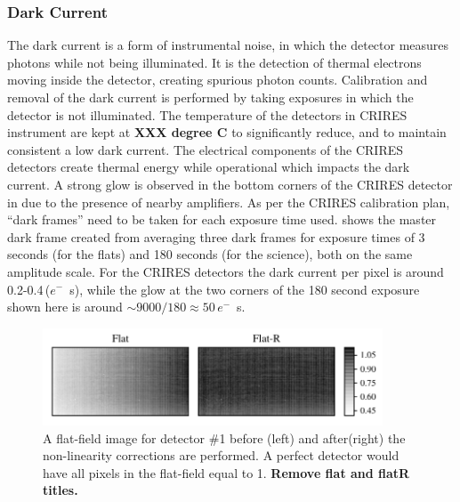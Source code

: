\subsubsection{Dark Current}
The dark current is a form of instrumental noise, in which the detector measures photons while not being illuminated. It is the detection of thermal electrons moving inside the detector, creating spurious photon counts. Calibration and removal of the dark current is performed by taking exposures in which the detector is not illuminated. 
 The temperature of the detectors in CRIRES instrument are kept at \textbf{XXX degree C} to significantly reduce, and to maintain consistent a low dark current. The electrical components of the CRIRES detectors create thermal energy while operational which impacts the dark current. A strong glow is observed in the bottom corners of the CRIRES detector in  due to the presence of nearby amplifiers. As per the CRIRES calibration plan, ``dark frames'' need to be taken for each exposure time used.  shows the master dark frame created from averaging three dark frames for exposure times of 3 seconds (for the flats) and 180 seconds (for the science), both on the same amplitude scale.
For the CRIRES detectors the dark current per pixel is around 0.2-0.4\,(\(e^{-}\)\si{\per\second}), while the glow at the two corners of the 180 second exposure shown here is around \(\sim9000 / 180\approx50\)\,\(e^{-}\)\si{\per\second}.


\begin{figure}[h]
    \centering
    \includegraphics[width=0.9\textwidth]{figures/reduction/master_flats_1.pdf}
    \caption{A flat-field image for detector \#1 before (left) and after(right) the non-linearity corrections are performed. A perfect detector would have all pixels in the flat-field equal to 1. \bf{\red Remove flat and flatR titles.}}
    \label{fig:masterflats}
\end{figure}


